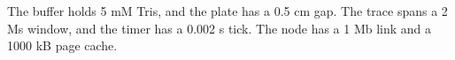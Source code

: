 The buffer holds 5 mM Tris, and the plate has a 0.5 cm gap.
The trace spans a 2 Ms window, and the timer has a 0.002 s tick.
The node has a 1 Mb link and a 1000 kB page cache.

